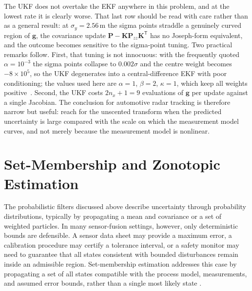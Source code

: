 \begin{example}
The UKF does not overtake the EKF anywhere in this problem, and at the lowest
rate it is clearly worse. That last row should be read with care rather than
as a general result: at $\sigma_y=2.56$\,m the sigma points straddle a genuinely
curved region of $\mathbf{g}$, the covariance update
$\mathbf{P}-\mathbf{K}\mathbf{P}_{zz}\mathbf{K}^{\mathsf T}$ has no Joseph-form
equivalent, and the outcome becomes sensitive to the sigma-point tuning. Two
practical remarks follow. First, that tuning is not innocuous: with the
frequently quoted $\alpha=10^{-3}$ the sigma points collapse to $0.002\sigma$
and the centre weight becomes $-8\times10^{5}$, so the UKF degenerates into a
central-difference EKF with poor conditioning; the values used here are
$\alpha=1$, $\beta=2$, $\kappa=1$, which keep all weights
positive~\cite{julier2004_ukf}. Second, the UKF costs $2n_x+1=9$ evaluations of
$\mathbf{g}$ per update against a single Jacobian. The conclusion for
automotive radar tracking is therefore narrow but useful: reach for the
unscented transform when the predicted uncertainty is large compared with the
scale on which the measurement model curves, and not merely because the
measurement model is nonlinear.
\end{example}







\section{Set-Membership and Zonotopic Estimation}
\label{sec:set-membership}

The probabilistic filters discussed above describe uncertainty through probability distributions, typically by propagating a mean and covariance or a set of weighted particles. In many sensor-fusion settings, however, only deterministic bounds are defensible. A sensor data sheet may provide a maximum error, a calibration procedure may certify a tolerance interval, or a safety monitor may need to guarantee that all states consistent with bounded disturbances remain inside an admissible region. Set-membership estimation addresses this case by propagating a set of all states compatible with the process model, measurements, and assumed error bounds, rather than a single most likely state \cite{alamo2005_zonotopes,rego2020_constrained_zonotopes}.

